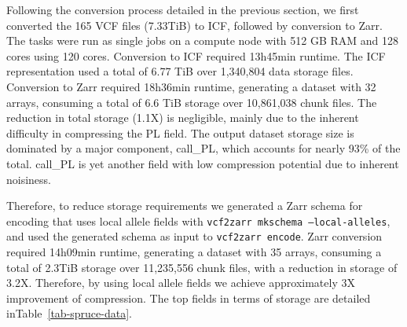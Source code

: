 \documentclass[a4paper,num-refs]{oup-contemporary}
\begin{document}
Following the conversion process detailed in the previous section, we
first converted the 165 VCF files (7.33TiB) to ICF, followed by
conversion to Zarr. The tasks were run as single jobs on a compute
node with 512 GB RAM and 128 cores using 120 cores. Conversion to ICF
required 13h45min runtime. The ICF representation used a total of 6.77
TiB over 1,340,804 data storage files. Conversion to Zarr required
18h36min runtime, generating a dataset with 32 arrays, consuming a
total of 6.6 TiB storage over 10,861,038 chunk files. The reduction in
total storage (1.1X) is negligible, mainly due to the inherent
difficulty in compressing the PL field. The output dataset storage
size is dominated by a major component, call\_PL, which accounts for
nearly 93\% of the total. call\_PL is yet another field with low
compression potential due to inherent noisiness.

Therefore, to reduce storage requirements we generated a Zarr schema
for encoding that uses local allele fields with \texttt{vcf2zarr
mkschema --local-alleles}, and used the generated schema as input to
\texttt{vcf2zarr encode}. Zarr conversion required 14h09min runtime,
generating a dataset with 35 arrays, consuming a total of 2.3TiB
storage over 11,235,556 chunk files, with a reduction in storage of
3.2X. Therefore, by using local allele fields we achieve approximately
3X improvement of compression. The top fields in terms of storage are
detailed inTable~\ref{tab-spruce-data}.
\end{document}
